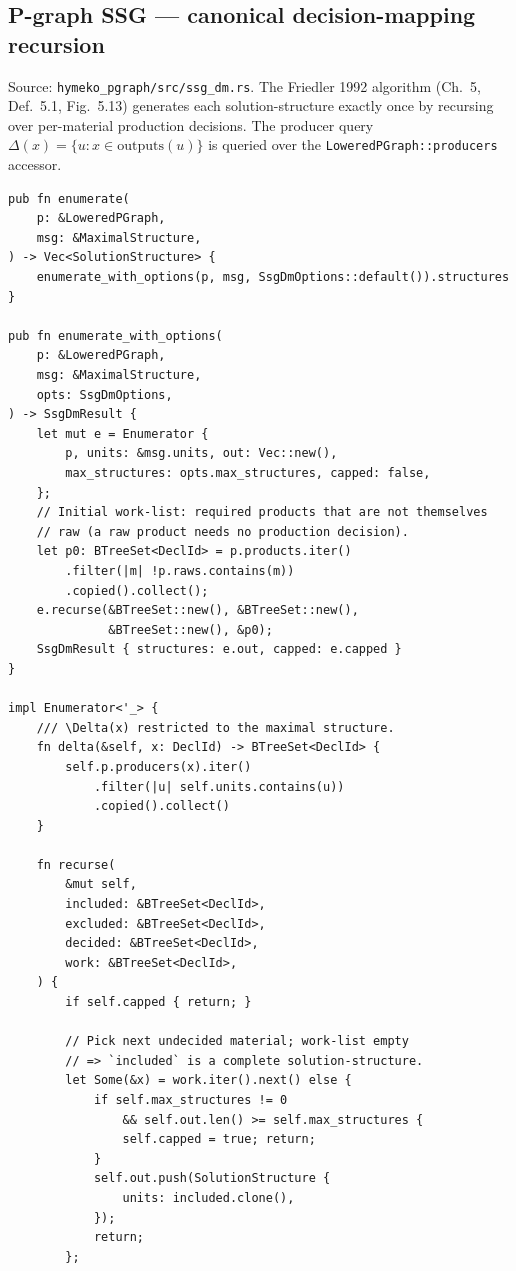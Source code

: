\documentclass[11pt]{article}
\begin{document}
\subsection{P-graph SSG --- canonical decision-mapping recursion}
\label{app:code-pgraph-ssg}

Source: \texttt{hymeko\_pgraph/src/ssg\_dm.rs}. The Friedler 1992
algorithm (Ch.\ 5, Def.\ 5.1, Fig.\ 5.13) generates each
solution-structure exactly once by recursing over per-material
production decisions. The producer query
$\Delta(x) = \{u : x \in \mathrm{outputs}(u)\}$ is queried over the
\texttt{LoweredPGraph::producers} accessor.

\begin{lstlisting}[style=ruststyle]
pub fn enumerate(
    p: &LoweredPGraph,
    msg: &MaximalStructure,
) -> Vec<SolutionStructure> {
    enumerate_with_options(p, msg, SsgDmOptions::default()).structures
}

pub fn enumerate_with_options(
    p: &LoweredPGraph,
    msg: &MaximalStructure,
    opts: SsgDmOptions,
) -> SsgDmResult {
    let mut e = Enumerator {
        p, units: &msg.units, out: Vec::new(),
        max_structures: opts.max_structures, capped: false,
    };
    // Initial work-list: required products that are not themselves
    // raw (a raw product needs no production decision).
    let p0: BTreeSet<DeclId> = p.products.iter()
        .filter(|m| !p.raws.contains(m))
        .copied().collect();
    e.recurse(&BTreeSet::new(), &BTreeSet::new(),
              &BTreeSet::new(), &p0);
    SsgDmResult { structures: e.out, capped: e.capped }
}

impl Enumerator<'_> {
    /// \Delta(x) restricted to the maximal structure.
    fn delta(&self, x: DeclId) -> BTreeSet<DeclId> {
        self.p.producers(x).iter()
            .filter(|u| self.units.contains(u))
            .copied().collect()
    }

    fn recurse(
        &mut self,
        included: &BTreeSet<DeclId>,
        excluded: &BTreeSet<DeclId>,
        decided: &BTreeSet<DeclId>,
        work: &BTreeSet<DeclId>,
    ) {
        if self.capped { return; }

        // Pick next undecided material; work-list empty
        // => `included` is a complete solution-structure.
        let Some(&x) = work.iter().next() else {
            if self.max_structures != 0
                && self.out.len() >= self.max_structures {
                self.capped = true; return;
            }
            self.out.push(SolutionStructure {
                units: included.clone(),
            });
            return;
        };


\end{lstlisting}
\end{document}

